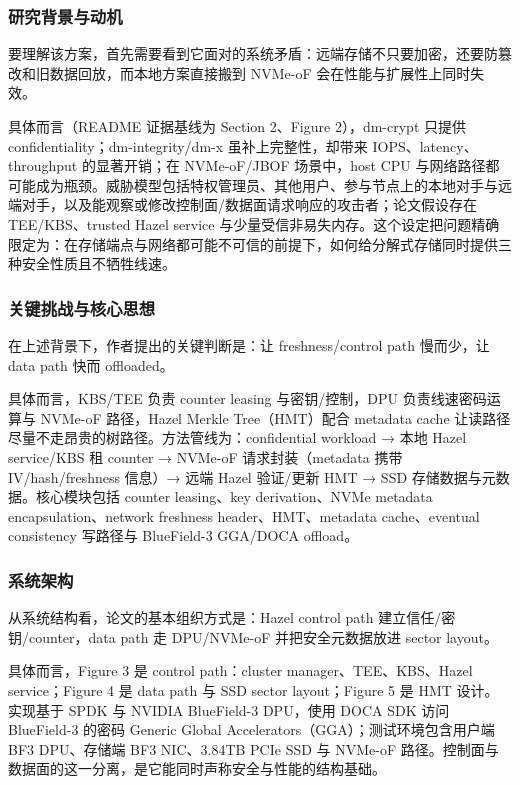 \documentclass[11pt]{ctexart}
\begin{document}
\subsubsection{研究背景与动机}
要理解该方案，首先需要看到它面对的系统矛盾：远端存储不只要加密，还要防篡改和旧数据回放，而本地方案直接搬到 NVMe-oF 会在性能与扩展性上同时失效。\par
具体而言（README 证据基线为 Section 2、Figure 2），dm-crypt 只提供 confidentiality；dm-integrity/dm-x 虽补上完整性，却带来 IOPS、latency、throughput 的显著开销；在 NVMe-oF/JBOF 场景中，host CPU 与网络路径都可能成为瓶颈。威胁模型包括特权管理员、其他用户、参与节点上的本地对手与远端对手，以及能观察或修改控制面/数据面请求响应的攻击者；论文假设存在 TEE/KBS、trusted Hazel service 与少量受信非易失内存。这个设定把问题精确限定为：在存储端点与网络都可能不可信的前提下，如何给分解式存储同时提供三种安全性质且不牺牲线速。\par
\subsubsection{关键挑战与核心思想}
在上述背景下，作者提出的关键判断是：让 freshness/control path 慢而少，让 data path 快而 offloaded。\par
具体而言，KBS/TEE 负责 counter leasing 与密钥/控制，DPU 负责线速密码运算与 NVMe-oF 路径，Hazel Merkle Tree（HMT）配合 metadata cache 让读路径尽量不走昂贵的树路径。方法管线为：confidential workload → 本地 Hazel service/KBS 租 counter → NVMe-oF 请求封装（metadata 携带 IV/hash/freshness 信息）→ 远端 Hazel 验证/更新 HMT → SSD 存储数据与元数据。核心模块包括 counter leasing、key derivation、NVMe metadata encapsulation、network freshness header、HMT、metadata cache、eventual consistency 写路径与 BlueField-3 GGA/DOCA offload。\par
\subsubsection{系统架构}
从系统结构看，论文的基本组织方式是：Hazel control path 建立信任/密钥/counter，data path 走 DPU/NVMe-oF 并把安全元数据放进 sector layout。\par
具体而言，Figure 3 是 control path：cluster manager、TEE、KBS、Hazel service；Figure 4 是 data path 与 SSD sector layout；Figure 5 是 HMT 设计。实现基于 SPDK 与 NVIDIA BlueField-3 DPU，使用 DOCA SDK 访问 BlueField-3 的密码 Generic Global Accelerators（GGA）；测试环境包含用户端 BF3 DPU、存储端 BF3 NIC、3.84TB PCIe SSD 与 NVMe-oF 路径。控制面与数据面的这一分离，是它能同时声称安全与性能的结构基础。\par
\end{document}
